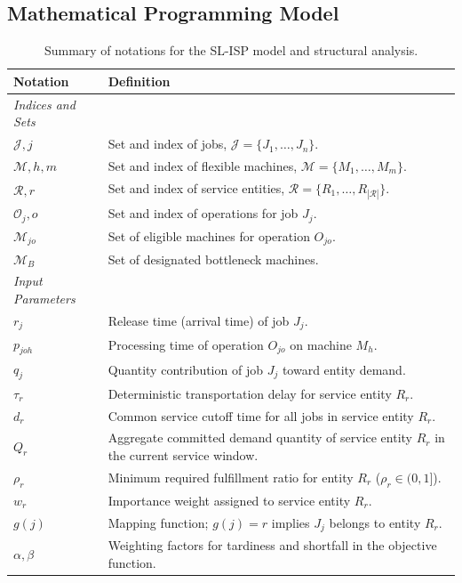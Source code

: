\documentclass[a4paper,fleqn]{cas-sc}
\begin{document}
\subsection{Mathematical Programming Model}
\label{sec:milp_model}
\begin{table}[htbp]
\centering
\caption{Summary of notations for the SL-ISP model and structural analysis.}
\label{tab:parameter_summary}
\small
\begin{tabular}{ll}
\toprule
\textbf{Notation} & \textbf{Definition} \\
\midrule
\textit{Indices and Sets} & \\
$\mathcal{J}, j$ & Set and index of jobs, $\mathcal{J} = \{J_1, \dots, J_n\}$. \\
$\mathcal{M}, h, m$ & Set and index of flexible machines, $\mathcal{M} = \{M_1, \dots, M_m\}$. \\
$\mathcal{R}, r$ & Set and index of service entities, $\mathcal{R} = \{R_1, \dots, R_{|\mathcal{R}|}\}$. \\
$\mathcal{O}_j, o$ & Set and index of operations for job $J_j$. \\
$\mathcal{M}_{jo}$ & Set of eligible machines for operation $O_{jo}$. \\
$\mathcal{M}_B$ & Set of designated bottleneck machines. \\
\midrule
\textit{Input Parameters} & \\
$r_j$ & Release time (arrival time) of job $J_j$. \\
$p_{joh}$ & Processing time of operation $O_{jo}$ on machine $M_h$. \\
$q_j$ & Quantity contribution of job $J_j$ toward entity demand. \\
$\tau_r$ & Deterministic transportation delay for service entity $R_r$. \\
$d_r$ & Common service cutoff time for all jobs in service entity $R_r$. \\
$Q_r$ & Aggregate committed demand quantity of service entity $R_r$ in the current service window. \\
$\rho_r$ & Minimum required fulfillment ratio for entity $R_r$ ($\rho_r \in (0, 1]$). \\
$w_r$ & Importance weight assigned to service entity $R_r$. \\
$g(j)$ & Mapping function; $g(j)=r$ implies $J_j$ belongs to entity $R_r$. \\
$\alpha, \beta$ & Weighting factors for tardiness and shortfall in the objective function. \\

\end{tabular}
\end{table}
\end{document}
